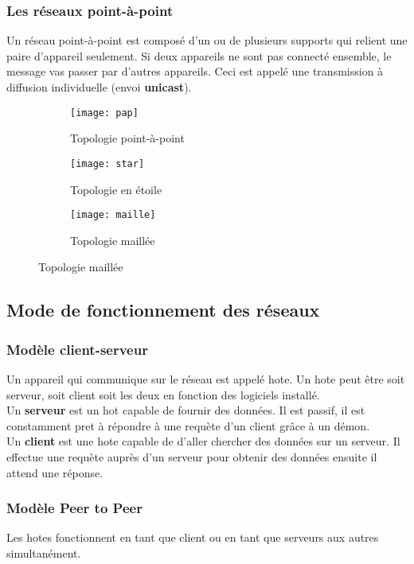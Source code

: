  \subsubsection{Les réseaux point-à-point}
 Un réseau point-à-point est composé d'un ou de plusieurs supports qui relient une paire d'appareil seulement.
 Si deux appareils ne sont pas connecté ensemble, le message vas passer par d'autres appareils. Ceci est appelé une transmission à diffusion individuelle (envoi \textbf{unicast}).
 \begin{figure}[h]
	 \begin{subfigure}{.5\textwidth}
		 \centering
		 \texttt{[image: pap]}
		 \caption{Topologie point-à-point}
	 \end{subfigure}
	 \begin{subfigure}{.5\textwidth}
		 \centering
		 \texttt{[image: star]}
		 \caption{Topologie en étoile}
	 \end{subfigure}
	 \begin{subfigure}{.5\textwidth}
		 \centering
		 \texttt{[image: maille]}
		 \caption{Topologie maillée}
	 \end{subfigure}
 \end{figure}

 \subsection{Mode de fonctionnement des réseaux}
 \subsubsection{Modèle client-serveur}
 Un appareil qui communique sur le réseau est appelé hote. Un hote peut être soit serveur, soit client soit les deux en fonction des logiciels installé.\\
 Un \textbf{serveur} est un hot capable de fournir des données. Il est passif, il est constamment pret à répondre à une requète d'un client grâce à un démon.\\
 Un \textbf{client} est une hote capable de d'aller chercher des données sur un serveur. Il effectue une requète auprès d'un serveur pour obtenir des données ensuite il attend une réponse.\\

 \subsubsection{Modèle Peer to Peer}
 Les hotes fonctionnent en tant que client ou en tant que serveurs aux autres simultanément.
